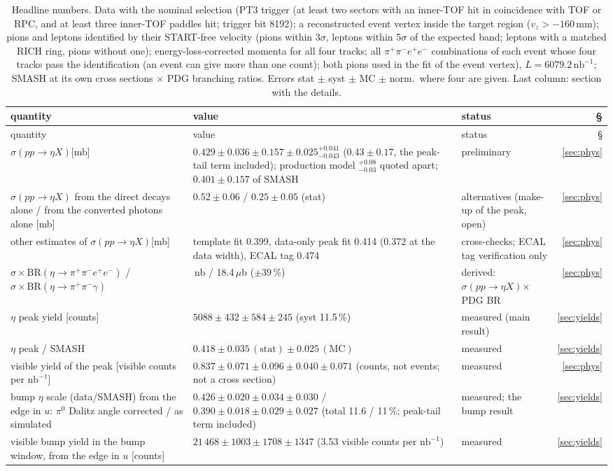 \documentclass[11pt,a4paper]{article}
\newcommand{\piz}{\ensuremath{\pi^{0}}\xspace}
\newcommand{\pipi}{\ensuremath{\pi^{+}\pi^{-}}\xspace}
\newcommand{\ppee}{\ensuremath{\pi^{+}\pi^{-}e^{+}e^{-}}\xspace}
\newcommand{\nbinv}{\ensuremath{\mathrm{nb}^{-1}}\xspace}
\newcommand{\vz}{\ensuremath{v_z}\xspace}
\newcommand{\sigeta}{\ensuremath{\sigma(pp\to\eta X)}\xspace}
\newcommand{\ptthree}{PT3 trigger (at least two sectors with an inner-TOF hit in coincidence with TOF or RPC, and at least three
inner-TOF paddles hit; trigger bit 8192)\xspace}
\newcommand{\selid}{pions and leptons identified by their START-free velocity (pions within 3$\sigma$, leptons within 5$\sigma$ of the
expected band; leptons with a matched RICH ring, pions without one); energy-loss-corrected momenta for all four tracks; all \ppee
combinations of each event whose four tracks pass the identification (an event can give more than one count)\xspace}
\newcommand{\selbase}{\ptthree; a reconstructed event vertex inside the target region ($\vz>-160$\,mm); \selid}
\newcommand{\selnom}{\selbase; both pions used in the fit of the event vertex\xspace}
\begin{document}
{\footnotesize
\setlength{\tabcolsep}{3pt}
\begin{longtable}{@{}>{\raggedright\arraybackslash}p{4.6cm} >{\raggedright\arraybackslash}p{\dimexpr\textwidth-8.3cm-6\tabcolsep\relax} >{\raggedright\arraybackslash}p{3.0cm} r@{}}
\caption{Headline numbers. Data with the nominal selection (\selnom), $L=6079.2\,\nbinv$; SMASH at its own cross sections $\times$ PDG
branching ratios. Errors stat $\pm$ syst $\pm$ MC $\pm$ norm.\ where four are given. Last column: section with the details.}
\label{tab:headline}\\
\toprule
quantity & value & status & \S \\
\midrule
\endfirsthead
\toprule
quantity & value & status & \S \\
\midrule
\endhead
\bottomrule
\endfoot
\sigeta [mb] & $0.429\pm0.036\pm0.157\pm0.025^{+0.041}_{-0.043}$ ($0.43\pm0.17$, the peak-tail term included); production model $^{+0.08}_{-0.03}$ quoted apart; $0.401\pm0.157$ of SMASH & preliminary & \ref{sec:phys} \\
\sigeta from the direct decays alone / from the converted photons alone [mb] & $0.52\pm0.06$ / $0.25\pm0.05$ (stat) & alternatives (make-up of the peak, open) & \ref{sec:phys} \\
other estimates of \sigeta [mb] & template fit 0.399, data-only peak fit 0.414 (0.372 at the data width), ECAL tag 0.474 & cross-checks; ECAL tag verification only & \ref{sec:phys} \\
$\sigma\times\mathrm{BR}(\eta\to\ppee)$ / $\sigma\times\mathrm{BR}(\eta\to\pipi\gamma)$ & 118.5\,nb / 18.4\,$\mu$b ($\pm39$\,\%) & derived: \sigeta $\times$ PDG BR & \ref{sec:phys} \\
$\eta$ peak yield [counts] & $5088\pm432\pm584\pm245$ (syst 11.5\,\%) & measured (main result) & \ref{sec:yields} \\
$\eta$ peak / SMASH & $0.418\pm0.035\,(\mathrm{stat})\pm0.025\,(\mathrm{MC})$ & measured & \ref{sec:yields} \\
visible yield of the peak [visible counts per \nbinv] & $0.837\pm0.071\pm0.096\pm0.040\pm0.071$ (counts, not events; not a cross section) & measured & \ref{sec:phys} \\
bump $\eta$ scale (data/SMASH) from the edge in $u$: \piz Dalitz angle corrected / as simulated & $0.426\pm0.020\pm0.034\pm0.030$ / $0.390\pm0.018\pm0.029\pm0.027$ (total 11.6 / 11\,\%; peak-tail term included) & measured; the bump result & \ref{sec:yields} \\
visible bump yield in the bump window, from the edge in $u$ [counts] & $21\,468\pm1003\pm1708\pm1347$ (3.53 visible counts per \nbinv) & measured & \ref{sec:yields} \\

\end{longtable}}
\end{document}
